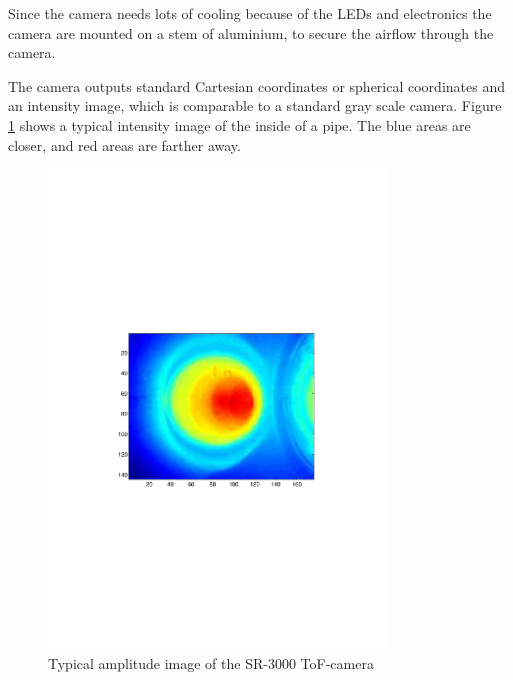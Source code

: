 Since the camera needs lots of cooling because of the LEDs and electronics the camera are
mounted on a stem of aluminium, to secure the airflow through the camera. 

The camera outputs standard Cartesian coordinates or spherical coordinates and an  
intensity image, which is comparable to a standard gray scale camera. Figure 
\ref{chap3:fig-tof-amppicture} shows a typical intensity image of the inside of a pipe. The
blue areas are closer, and red areas are farther away. 
\begin{figure}[htbp]
    \centering
    \includegraphics[width=0.8\textwidth]{pics/tof-amppicture}
    \caption{Typical amplitude image of the SR-3000 ToF-camera}
    \label{chap3:fig-tof-amppicture}
\end{figure}


